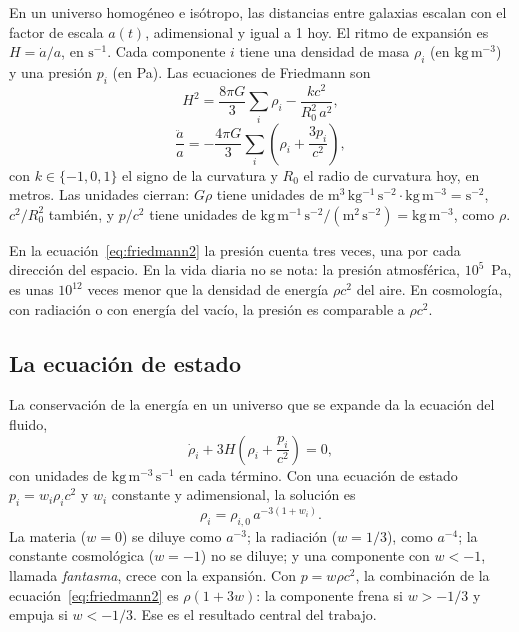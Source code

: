 \documentclass[11pt,a4paper]{article}
\begin{document}
En un universo homogéneo e isótropo, las distancias entre galaxias escalan con el factor de escala $a(t)$, adimensional y igual a 1 hoy. El ritmo de expansión es $H = \dot a/a$, en $\mathrm{s^{-1}}$. Cada componente $i$ tiene una densidad de masa $\rho_i$ (en $\mathrm{kg\,m^{-3}}$) y una presión $p_i$ (en Pa). Las ecuaciones de Friedmann son
\begin{equation}\label{eq:friedmann1}
H^2 = \frac{8\pi G}{3}\sum_i \rho_i - \frac{k c^2}{R_0^2\, a^2},
\end{equation}
\begin{equation}\label{eq:friedmann2}
\frac{\ddot a}{a} = -\frac{4\pi G}{3}\sum_i \left(\rho_i + \frac{3p_i}{c^2}\right),
\end{equation}
con $k \in \{-1, 0, 1\}$ el signo de la curvatura y $R_0$ el radio de curvatura hoy, en metros. Las unidades cierran: $G\rho$ tiene unidades de $\mathrm{m^3\,kg^{-1}\,s^{-2}\cdot kg\,m^{-3}} = \mathrm{s^{-2}}$, $c^2/R_0^2$ también, y $p/c^2$ tiene unidades de $\mathrm{kg\,m^{-1}\,s^{-2}/(m^2\,s^{-2})} = \mathrm{kg\,m^{-3}}$, como $\rho$.

En la ecuación~\eqref{eq:friedmann2} la presión cuenta tres veces, una por cada dirección del espacio. En la vida diaria no se nota: la presión atmosférica, $10^5$~Pa, es unas $10^{12}$ veces menor que la densidad de energía $\rho c^2$ del aire. En cosmología, con radiación o con energía del vacío, la presión es comparable a $\rho c^2$.

\subsection{La ecuación de estado}

La conservación de la energía en un universo que se expande da la ecuación del fluido,
\begin{equation}\label{eq:fluido}
\dot\rho_i + 3H\left(\rho_i + \frac{p_i}{c^2}\right) = 0 ,
\end{equation}
con unidades de $\mathrm{kg\,m^{-3}\,s^{-1}}$ en cada término. Con una ecuación de estado $p_i = w_i \rho_i c^2$ y $w_i$ constante y adimensional, la solución es
\begin{equation}\label{eq:escala}
\rho_i = \rho_{i,0}\, a^{-3(1+w_i)} .
\end{equation}
La materia ($w = 0$) se diluye como $a^{-3}$; la radiación ($w = 1/3$), como $a^{-4}$; la constante cosmológica ($w = -1$) no se diluye; y una componente con $w < -1$, llamada \emph{fantasma}, crece con la expansión. Con $p = w\rho c^2$, la combinación de la ecuación~\eqref{eq:friedmann2} es $\rho(1 + 3w)$: la componente frena si $w > -1/3$ y empuja si $w < -1/3$. Ese es el resultado central del trabajo.
\end{document}

